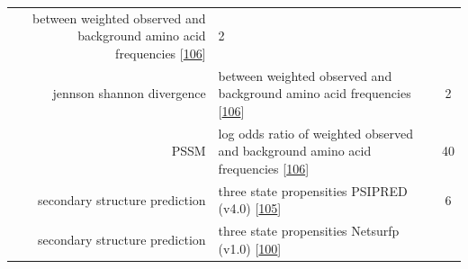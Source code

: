 \documentclass[12pt,a4paper,twoside]{book}
\theoremstyle{definition}
\theoremstyle{definition}
\theoremstyle{remark}
\begin{document}
\begin{longtable}[]{@{}rlc@{}}
\begin{minipage}[t]{0.50\columnwidth}
between weighted observed and background amino acid frequencies
{[}\protect\hyperlink{ref-Robinson1991}{106}{]}\strut
\end{minipage} & \begin{minipage}[t]{0.18\columnwidth}\centering\strut
2\strut
\end{minipage}\tabularnewline
\begin{minipage}[t]{0.23\columnwidth}\raggedleft\strut
jennson shannon divergence\strut
\end{minipage} & \begin{minipage}[t]{0.50\columnwidth}\raggedright\strut
between weighted observed and background amino acid frequencies
{[}\protect\hyperlink{ref-Robinson1991}{106}{]}\strut
\end{minipage} & \begin{minipage}[t]{0.18\columnwidth}\centering\strut
2\strut
\end{minipage}\tabularnewline
\begin{minipage}[t]{0.23\columnwidth}\raggedleft\strut
PSSM\strut
\end{minipage} & \begin{minipage}[t]{0.50\columnwidth}\raggedright\strut
log odds ratio of weighted observed and background amino acid
frequencies {[}\protect\hyperlink{ref-Robinson1991}{106}{]}\strut
\end{minipage} & \begin{minipage}[t]{0.18\columnwidth}\centering\strut
40\strut
\end{minipage}\tabularnewline
\begin{minipage}[t]{0.23\columnwidth}\raggedleft\strut
secondary structure prediction\strut
\end{minipage} & \begin{minipage}[t]{0.50\columnwidth}\raggedright\strut
three state propensities PSIPRED (v4.0)
{[}\protect\hyperlink{ref-Jones1999}{105}{]}\strut
\end{minipage} & \begin{minipage}[t]{0.18\columnwidth}\centering\strut
6\strut
\end{minipage}\tabularnewline
\begin{minipage}[t]{0.23\columnwidth}\raggedleft\strut
secondary structure prediction\strut
\end{minipage} & \begin{minipage}[t]{0.50\columnwidth}\raggedright\strut
three state propensities Netsurfp (v1.0)
{[}\protect\hyperlink{ref-Petersen2009a}{100}{]}\strut
\end{minipage} & \begin{minipage}[t]{0.18\columnwidth}\centering\strut

\end{minipage}
\end{longtable}
\end{document}
